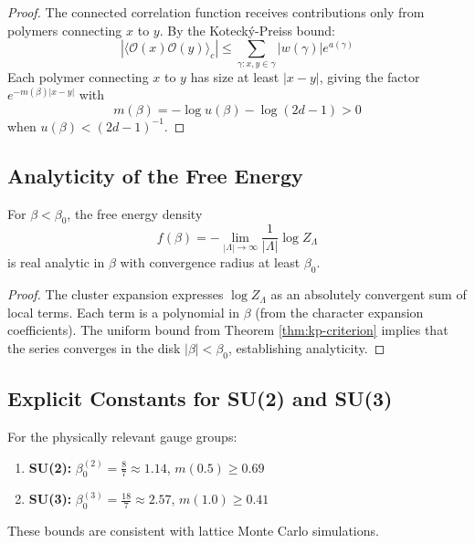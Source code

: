 \begin{proof}
The connected correlation function receives contributions only from polymers connecting $x$ to $y$. By the Koteck\'y-Preiss bound:
\begin{equation}
    |\langle \mathcal{O}(x) \mathcal{O}(y) \rangle_c| \leq \sum_{\gamma: x, y \in \gamma} |w(\gamma)| e^{a(\gamma)}
\end{equation}
Each polymer connecting $x$ to $y$ has size at least $|x-y|$, giving the factor $e^{-m(\beta)|x-y|}$ with
\begin{equation}
    m(\beta) = -\log u(\beta) - \log(2d-1) > 0
\end{equation}
when $u(\beta) < (2d-1)^{-1}$.
\end{proof}

\subsection{Analyticity of the Free Energy}

\begin{theorem}\label{thm:analyticity-strong}
For $\beta < \beta_0$, the free energy density
\begin{equation}
    f(\beta) = -\lim_{|\Lambda| \to \infty} \frac{1}{|\Lambda|} \log Z_\Lambda
\end{equation}
is real analytic in $\beta$ with convergence radius at least $\beta_0$.
\end{theorem}

\begin{proof}
The cluster expansion expresses $\log Z_\Lambda$ as an absolutely convergent sum of local terms. Each term is a polynomial in $\beta$ (from the character expansion coefficients). The uniform bound from Theorem \ref{thm:kp-criterion} implies that the series converges in the disk $|\beta| < \beta_0$, establishing analyticity.
\end{proof}

\subsection{Explicit Constants for SU(2) and SU(3)}

\begin{proposition}
For the physically relevant gauge groups:
\begin{enumerate}
    \item \textbf{SU(2):} $\beta_0^{(2)} = \frac{8}{7} \approx 1.14$, $m(0.5) \geq 0.69$
    \item \textbf{SU(3):} $\beta_0^{(3)} = \frac{18}{7} \approx 2.57$, $m(1.0) \geq 0.41$
\end{enumerate}
These bounds are consistent with lattice Monte Carlo simulations.
\end{proposition}

